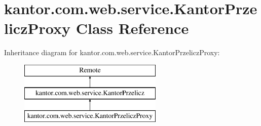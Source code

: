 \hypertarget{classkantor_1_1com_1_1web_1_1service_1_1_kantor_przelicz_proxy}{\section{kantor.\+com.\+web.\+service.\+Kantor\+Przelicz\+Proxy Class Reference}
\label{classkantor_1_1com_1_1web_1_1service_1_1_kantor_przelicz_proxy}
}
Inheritance diagram for kantor.\+com.\+web.\+service.\+Kantor\+Przelicz\+Proxy\+:\begin{figure}[H]
\begin{center}
\leavevmode
\includegraphics[height=3.000000cm]{classkantor_1_1com_1_1web_1_1service_1_1_kantor_przelicz_proxy}
\end{center}
\end{figure}
